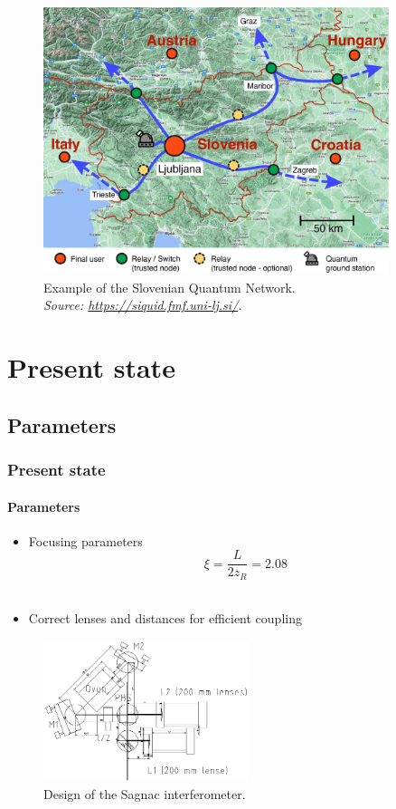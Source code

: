 \documentclass[serif,8pt]{beamer}
\begin{document}
\addtocounter{framenumber}{-1}
\begin{frame}[t]
	\begin{figure}
		\begin{center}
			\includegraphics[width=0.9\textwidth]{SI_network_with_groundstation.jpg}
		\end{center}
		\caption{Example of the Slovenian Quantum Network.\\\textit{Source: \url{https://siquid.fmf.uni-lj.si/}.}}
	\end{figure}
\end{frame}

\section{Present state}
\subsection{Parameters}
\begin{frame}[t]
	\frametitle{Present state}
	\framesubtitle{Parameters}
		\begin{itemize}
			\item Focusing parameters \cite{bennik}
					\begin{equation*}
							\xi = \frac{L}{2 z_R} = 2.08
						\label{eq:Focusing parameter}
					\end{equation*}\\
			\item Correct lenses and distances for efficient coupling
		\end{itemize}
	\begin{figure}[!ht]
	  \centering
	  \includegraphics[width=6cm]{SagnacDesign.png}
	  \caption{Design of the Sagnac interferometer.}
	\end{figure}
\end{frame}
\end{document}
